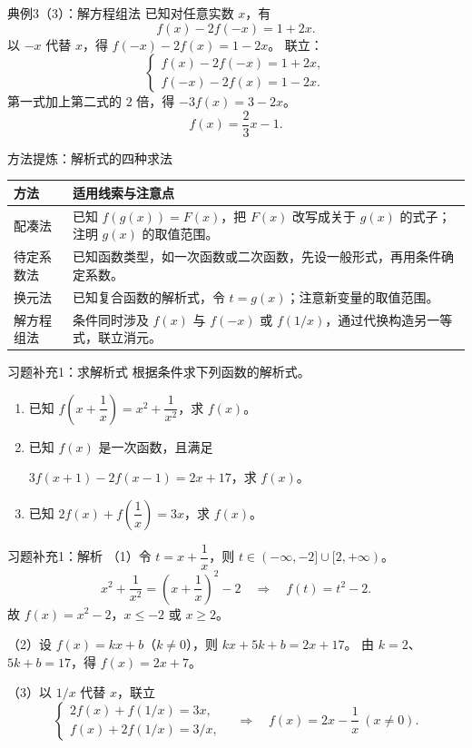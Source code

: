 \begin{frame}[t]{典例3（3）：解方程组法}
已知对任意实数 $x$，有
\[f(x)-2f(-x)=1+2x.\]
以 $-x$ 代替 $x$，得 $f(-x)-2f(x)=1-2x$。
\pause
联立：
\[\begin{cases}f(x)-2f(-x)=1+2x,\\f(-x)-2f(x)=1-2x.\end{cases}\]
第一式加上第二式的 $2$ 倍，得 $-3f(x)=3-2x$。
\[\boxed{f(x)=\frac23x-1.}\]
\end{frame}
\begin{frame}[t]{方法提炼：解析式的四种求法}
\small\renewcommand{\arraystretch}{1.8}
\begin{tabular}{p{23mm}p{111mm}}\toprule
方法&适用线索与注意点\\\midrule
配凑法&已知 $f(g(x))=F(x)$，把 $F(x)$ 改写成关于 $g(x)$ 的式子；注明 $g(x)$ 的取值范围。\\
待定系数法&已知函数类型，如一次函数或二次函数，先设一般形式，再用条件确定系数。\\
换元法&已知复合函数的解析式，令 $t=g(x)$；注意新变量的取值范围。\\
解方程组法&条件同时涉及 $f(x)$ 与 $f(-x)$ 或 $f(1/x)$，通过代换构造另一等式，联立消元。\\\bottomrule
\end{tabular}
\end{frame}
\begin{frame}[t]{习题补充1：求解析式}
根据条件求下列函数的解析式。
\begin{enumerate}
\setlength{\itemsep}{6mm}
\item 已知 $f\left(x+\dfrac1x\right)=x^2+\dfrac1{x^2}$，求 $f(x)$。
\item 已知 $f(x)$ 是一次函数，且满足\par
$3f(x+1)-2f(x-1)=2x+17$，求 $f(x)$。
\item 已知 $2f(x)+f\left(\dfrac1x\right)=3x$，求 $f(x)$。
\end{enumerate}
\end{frame}
\begin{frame}[t]{习题补充1：解析}
\small
（1）令 $t=x+\dfrac1x$，则 $t\in(-\infty,-2]\cup[2,+\infty)$。
\[x^2+\frac1{x^2}=\left(x+\frac1x\right)^2-2
\quad\Longrightarrow\quad f(t)=t^2-2.\]
故 $f(x)=x^2-2$，$x\le-2$ 或 $x\ge2$。
\medskip\par
（2）设 $f(x)=kx+b$（$k\ne0$），则 $kx+5k+b=2x+17$。
由 $k=2$、$5k+b=17$，得 $\boxed{f(x)=2x+7}$。
\medskip\par
（3）以 $1/x$ 代替 $x$，联立
\[\begin{cases}2f(x)+f(1/x)=3x,\\f(x)+2f(1/x)=3/x,\end{cases}
\quad\Longrightarrow\quad \boxed{f(x)=2x-\frac1x\ (x\ne0)}.\]
\end{frame}
